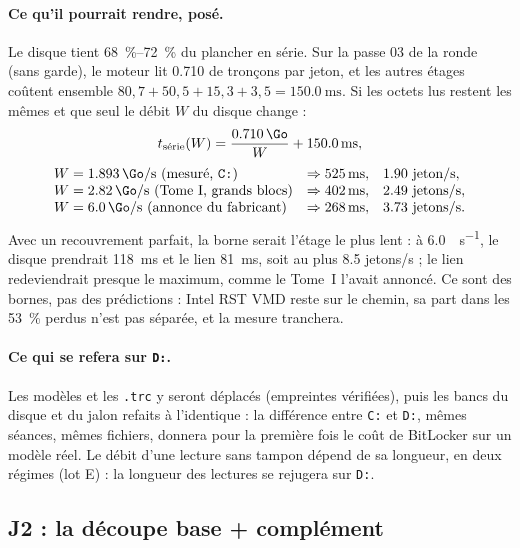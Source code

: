 \paragraph{Ce qu'il pourrait rendre, posé.} Le disque tient \SIrange{68}{72}{\percent} du plancher en série. Sur la passe 03 de la ronde (sans garde), le moteur lit \SI{0.710}{\Go} de tronçons par jeton, et les autres étages coûtent ensemble $80{,}7 + 50{,}5 + 15{,}3 + 3{,}5 = \SI{150.0}{\milli\second}$. Si les octets lus restent les mêmes et que seul le débit $W$ du disque change \calc :
\[
t_{\text{série}}(W) = \frac{\SI{0.710}{\Go}}{W} + \SI{150.0}{\milli\second},
\]
\[
\begin{array}{@{}lll@{}}
W = \SI{1.893}{\Go\per\second} \text{ (mesuré, \texttt{C:})} & \Rightarrow \SI{525}{\milli\second}, & \num{1.90} \text{ jeton/s},\\
W = \SI{2.82}{\Go\per\second} \text{ (Tome~I, grands blocs)} & \Rightarrow \SI{402}{\milli\second}, & \num{2.49} \text{ jetons/s},\\
W = \SI{6.0}{\Go\per\second} \text{ (annonce du fabricant)} & \Rightarrow \SI{268}{\milli\second}, & \num{3.73} \text{ jetons/s}.
\end{array}
\]
Avec un recouvrement parfait, la borne serait l'étage le plus lent : à \SI{6.0}{\Go\per\second}, le disque prendrait \SI{118}{\milli\second} et le lien \SI{81}{\milli\second}, soit au plus \num{8.5} jetons/s ; le lien redeviendrait presque le maximum, comme le Tome~I l'avait annoncé. Ce sont des bornes, pas des prédictions : Intel RST VMD reste sur le chemin, sa part dans les \SI{53}{\percent} perdus n'est pas séparée, et la mesure tranchera.

\paragraph{Ce qui se refera sur \texttt{D:}.} Les modèles et les \texttt{.trc} y seront déplacés (empreintes vérifiées), puis les bancs du disque et du jalon refaits à l'identique : la différence entre \texttt{C:} et \texttt{D:}, mêmes séances, mêmes fichiers, donnera pour la première fois le coût de BitLocker sur un modèle réel. Le débit d'une lecture sans tampon dépend de sa longueur, en deux régimes (lot E) : la longueur des lectures se rejugera sur \texttt{D:}.

\subsection{J2 : la découpe base + complément}\label{t2d-sec:j2}

